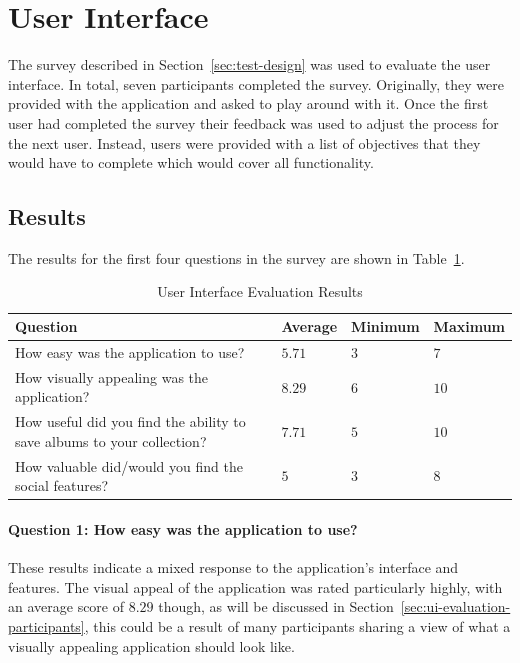 \section{User Interface}
The survey described in Section~\ref{sec:test-design} was used to evaluate the user interface. In total, seven participants completed the survey. Originally, they were provided with the application and asked to play around with it. Once the first user had completed the survey their feedback was used to adjust the process for the next user. Instead, users were provided with a list of objectives that they would have to complete which would cover all functionality.

\subsection{Results}
The results for the first four questions in the survey are shown in Table~\ref{tab:ui-evaluation-results}.
\begin{table}
    \centering
    \begin{tabular}{|m{5cm}|m{2cm}|m{2cm}|m{2cm}|}
        \hline
        \textbf{Question} & \textbf{Average} & \textbf{Minimum} & \textbf{Maximum} \\
        \hline
        How easy was the application to use? & $5.71$ & $3$ & $7$ \\
        \hline
        How visually appealing was the application? & $8.29$ & $6$ & $10$ \\
        \hline
        How useful did you find the ability to save albums to your collection? & $7.71$ & $5$ & $10$ \\
        \hline
        How valuable did/would you find the social features? & $5$ & $3$ & $8$ \\
        \hline
    \end{tabular}
    \caption{User Interface Evaluation Results}
    \label{tab:ui-evaluation-results}
\end{table}

\paragraph{Question 1: How easy was the application to use?}
These results indicate a mixed response to the application's interface and features. The visual appeal of the application was rated particularly highly, with an average score of $8.29$ though, as will be discussed in Section~\ref{sec:ui-evaluation-participants}, this could be a result of many participants sharing a view of what a visually appealing application should look like.

